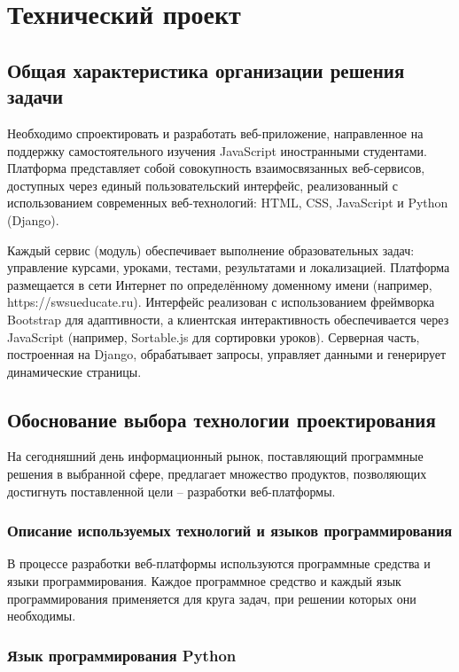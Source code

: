\section{Технический проект}
\subsection{Общая характеристика организации решения задачи}

Необходимо спроектировать и разработать веб-приложение, направленное на поддержку самостоятельного изучения JavaScript иностранными студентами. Платформа представляет собой совокупность взаимосвязанных веб-сервисов, доступных через единый пользовательский интерфейс, реализованный с использованием современных веб-технологий: HTML, CSS, JavaScript и Python (Django).

Каждый сервис (модуль) обеспечивает выполнение образовательных задач: управление курсами, уроками, тестами, результатами и локализацией. Платформа размещается в сети Интернет по определённому доменному имени (например, https://swsueducate.ru). Интерфейс реализован с использованием фреймворка Bootstrap для адаптивности, а клиентская интерактивность обеспечивается через JavaScript (например, Sortable.js для сортировки уроков). Серверная часть, построенная на Django, обрабатывает запросы, управляет данными и генерирует динамические страницы.

\subsection{Обоснование выбора технологии проектирования}

На сегодняшний день информационный рынок, поставляющий программные решения в выбранной сфере, предлагает множество продуктов, позволяющих достигнуть поставленной цели – разработки веб-платформы.

\subsubsection{Описание используемых технологий и языков программирования}

В процессе разработки веб-платформы используются программные средства и языки программирования. Каждое программное средство и каждый язык программирования применяется для круга задач, при решении которых они необходимы.

\subsubsection{Язык программирования Python}


